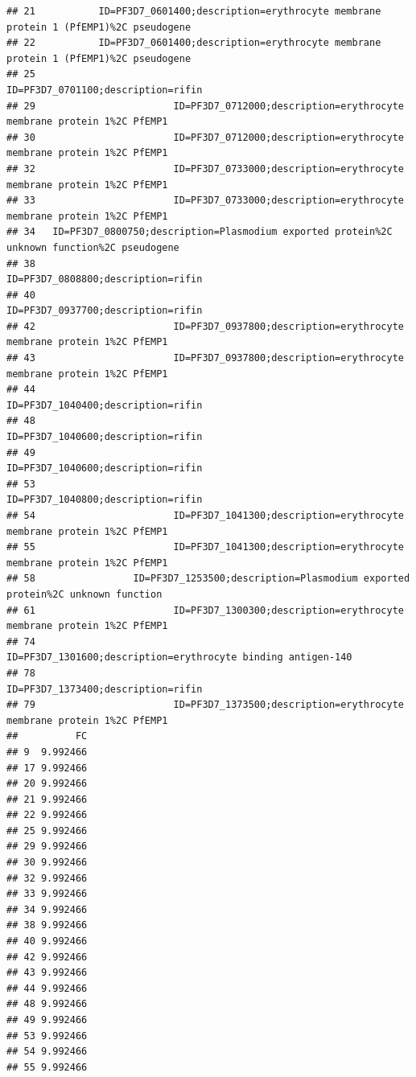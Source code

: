 \documentclass[12pt, a4paper]{article}\usepackage[]{graphicx}\usepackage[]{color}
\makeatletter
\newenvironment{kframe}{%
 \def\at@end@of@kframe{}%
 \ifinner\ifhmode%
  \def\at@end@of@kframe{\end{minipage}}%
  \begin{minipage}{\columnwidth}%
 \fi\fi%
 \def\FrameCommand##1{\hskip\@totalleftmargin \hskip-\fboxsep
 \colorbox{shadecolor}{##1}\hskip-\fboxsep
     \hskip-\linewidth \hskip-\@totalleftmargin \hskip\columnwidth}%
 \MakeFramed {\advance\hsize-\width
   \@totalleftmargin\z@ \linewidth\hsize
   \@setminipage}}%
 {\par\unskip\endMakeFramed%
 \at@end@of@kframe}
\newenvironment{knitrout}{}{} %
\makeatother
\begin{document}
\begin{knitrout}
\begin{kframe}
\begin{verbatim}
## 21           ID=PF3D7_0601400;description=erythrocyte membrane protein 1 (PfEMP1)%2C pseudogene
## 22           ID=PF3D7_0601400;description=erythrocyte membrane protein 1 (PfEMP1)%2C pseudogene
## 25                                                           ID=PF3D7_0701100;description=rifin
## 29                        ID=PF3D7_0712000;description=erythrocyte membrane protein 1%2C PfEMP1
## 30                        ID=PF3D7_0712000;description=erythrocyte membrane protein 1%2C PfEMP1
## 32                        ID=PF3D7_0733000;description=erythrocyte membrane protein 1%2C PfEMP1
## 33                        ID=PF3D7_0733000;description=erythrocyte membrane protein 1%2C PfEMP1
## 34   ID=PF3D7_0800750;description=Plasmodium exported protein%2C unknown function%2C pseudogene
## 38                                                           ID=PF3D7_0808800;description=rifin
## 40                                                           ID=PF3D7_0937700;description=rifin
## 42                        ID=PF3D7_0937800;description=erythrocyte membrane protein 1%2C PfEMP1
## 43                        ID=PF3D7_0937800;description=erythrocyte membrane protein 1%2C PfEMP1
## 44                                                           ID=PF3D7_1040400;description=rifin
## 48                                                           ID=PF3D7_1040600;description=rifin
## 49                                                           ID=PF3D7_1040600;description=rifin
## 53                                                           ID=PF3D7_1040800;description=rifin
## 54                        ID=PF3D7_1041300;description=erythrocyte membrane protein 1%2C PfEMP1
## 55                        ID=PF3D7_1041300;description=erythrocyte membrane protein 1%2C PfEMP1
## 58                 ID=PF3D7_1253500;description=Plasmodium exported protein%2C unknown function
## 61                        ID=PF3D7_1300300;description=erythrocyte membrane protein 1%2C PfEMP1
## 74                                 ID=PF3D7_1301600;description=erythrocyte binding antigen-140
## 78                                                           ID=PF3D7_1373400;description=rifin
## 79                        ID=PF3D7_1373500;description=erythrocyte membrane protein 1%2C PfEMP1
##          FC
## 9  9.992466
## 17 9.992466
## 20 9.992466
## 21 9.992466
## 22 9.992466
## 25 9.992466
## 29 9.992466
## 30 9.992466
## 32 9.992466
## 33 9.992466
## 34 9.992466
## 38 9.992466
## 40 9.992466
## 42 9.992466
## 43 9.992466
## 44 9.992466
## 48 9.992466
## 49 9.992466
## 53 9.992466
## 54 9.992466
## 55 9.992466

\end{verbatim}
\end{kframe}
\end{knitrout}
\end{document}
